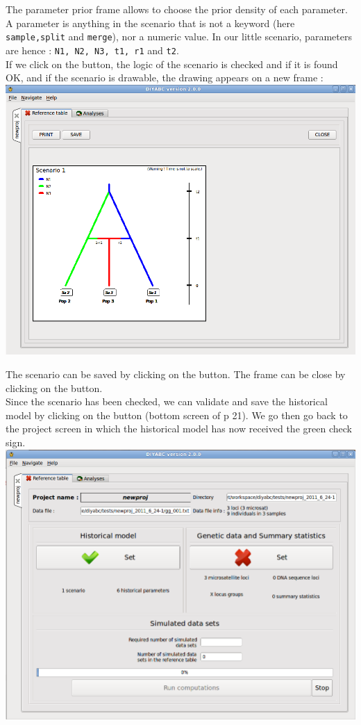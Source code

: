 The parameter prior frame allows to choose the prior density of each parameter. A parameter is anything in the scenario that is not a keyword (here \texttt{sample,split} and \texttt{merge}), nor a numeric value. In our little scenario, parameters are hence : \texttt{N1, N2, N3, t1, r1} and \texttt{t2}.\\

If we click on the  button, the logic of the scenario is checked and if it is found OK, and if the scenario is drawable, the drawing appears on a new frame : \\

\includegraphics[scale=0.35]{gui_pictures/Capture-DIYABC-13.png} 

The scenario can be saved by clicking on the  button. The frame can be close by clicking on the  button.\\

Since the scenario has been checked, we can validate and save the historical model by clicking on the   button (bottom screen of p 21). We go then go back to the project screen in which the historical model has now received the green check sign.\\

\includegraphics[scale=0.35]{gui_pictures/Capture-DIYABC-14.png} 

